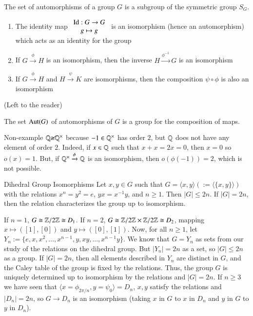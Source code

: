 \documentclass[12pt, a4paper, twoside, openright, titlepage]{book}
\begin{document}
\begin{prop}{}{}
    The set of automorphisms of a group $G$ is a subgroup of the symmetric group $S_G$.\begin{enumerate}
        \item The identity map $\begin{array}{c} \operatorname{Id}:G\rightarrow G \\ g\mapsto g \end{array}$ is an isomorphism (hence an automorphism) which acts as an identity for the group
        \item If $G\xrightarrow{\phi}H$ is an isomorphism, then the inverse $H\xrightarrow{\phi^{-1}}G$ is an isomorphism
        \item If $G\xrightarrow{\phi}H$ and $H\xrightarrow{\psi}K$ are isomorphisms, then the composition $\psi \circ \phi$ is also an isomorphism
    \end{enumerate}
\end{prop}
\begin{proof*}{}{}
    (Left to the reader)
\end{proof*}

\begin{cor}{}{}
    The set $\operatorname{Aut}(G)$ of automorphisms of $G$ is a group for the composition of maps.
\end{cor}

\begin{eg}{Non-example}{}
    $\mathbb Q\cancel{\cong} \mathbb Q^{\times}$ because $-1 \in \mathbb Q^{\times}$ has order $2$, but $\mathbb Q$ does not have any element of order $2$. Indeed, if $x \in \mathbb Q$ such that $x+x=2x = 0$, then $x = 0$ so $o(x) = 1$. But, if $\mathbb Q^{\times}\xrightarrow{\phi}\mathbb Q$ is an isomorphism, then $o(\phi(-1)) = 2$, which is not possible.
\end{eg}

\begin{thm}{Dihedral Group Isomorphisms}{}
    Let $x,y \in G$ such that $G = \langle x,y \rangle (:= \langle \{x,y\}\rangle)$ with the relations $x^n = y^2 = e$, $yx = x^{-1}y$, and $n \geq 1$. Then $|G| \leq 2n$. If $|G| = 2n$, then the relation characterizes the group up to isomorphism.
\end{thm}
\begin{proof*}{}{}
    If $n = 1$, $G \cong \mathbb Z/2\mathbb Z \cong D_1$. If $n = 2$, $G \cong \mathbb Z/2\mathbb Z \times \mathbb Z/2\mathbb Z \cong D_2$, mapping $x \mapsto ([1],[0])$ and $y \mapsto ([0],[1])$. Now, for all $n \geq 1$, let $Y_n := \{e,x,x^2,...,x^{n-1},y,xy,...,x^{n-1}y\}$. We know that $G = Y_n$ as sets from our study of the relations on the dihedral group. But $|Y_n| = 2n$ as a set, so $|G| \leq 2n$ as a group. If $|G| = 2n$, then all elements described in $Y_n$ are distinct in $G$, and the Caley table of the group is fixed by the relations. Thus, the group $G$ is uniquely determined up to isomorphism by the relations and $|G| = 2n$. If $n \geq 3$ we have seen that $\langle x = \phi_{2\pi/n},y = \psi_0\rangle = D_n$, $x,y$ satisfy the relations and $|D_n| = 2n$, so $G \rightarrow D_n$ is an isomorphism (taking $x$ in $G$ to $x$ in $D_n$ and $y$ in $G$ to $y$ in $D_n$).
\end{proof*}
\end{document}
